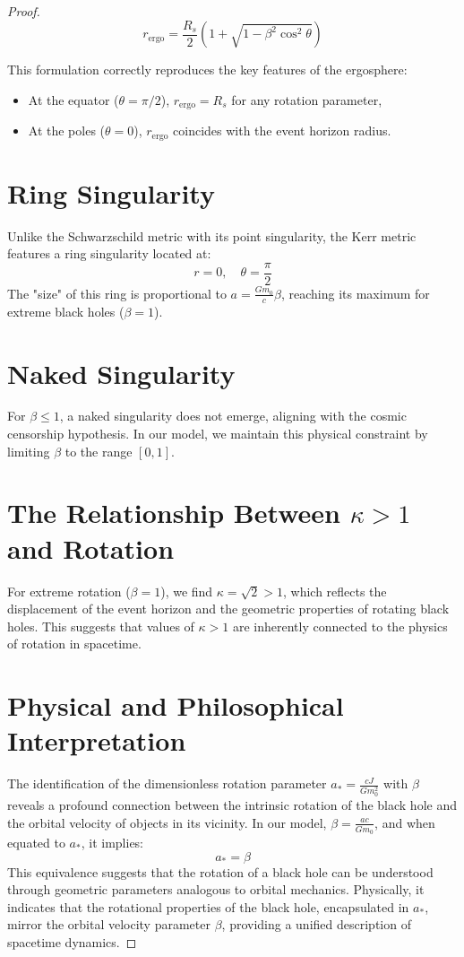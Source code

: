 \documentclass{article}
\begin{document}
\begin{theorem}
\begin{proof}
\[
r_{\text{ergo}} = \frac{R_s}{2} \left(1 + \sqrt{1 - \beta^2 \cos^2 \theta}\right)
\]

This formulation correctly reproduces the key features of the ergosphere:
\begin{itemize}
    \item At the equator (\(\theta = \pi / 2\)), \(r_{\text{ergo}} = R_s\) for any rotation parameter,
    \item At the poles (\(\theta = 0\)), \(r_{\text{ergo}}\) coincides with the event horizon radius.
\end{itemize}

\section{Ring Singularity}
Unlike the Schwarzschild metric with its point singularity, the Kerr metric features a ring singularity located at:
\[
r = 0, \quad \theta = \frac{\pi}{2}
\]
The "size" of this ring is proportional to \(a = \frac{G m_0}{c} \beta\), reaching its maximum for extreme black holes (\(\beta = 1\)).

\section{Naked Singularity}
For \(\beta \leq 1\), a naked singularity does not emerge, aligning with the cosmic censorship hypothesis. In our model, we maintain this physical constraint by limiting \(\beta\) to the range \([0, 1]\).

\section{The Relationship Between \(\kappa > 1\) and Rotation}
For extreme rotation (\(\beta = 1\)), we find \(\kappa = \sqrt{2} > 1\), which reflects the displacement of the event horizon and the geometric properties of rotating black holes. This suggests that values of \(\kappa > 1\) are inherently connected to the physics of rotation in spacetime.

\section{Physical and Philosophical Interpretation}
The identification of the dimensionless rotation parameter \(a_* = \frac{c J}{G m_0^2}\) with \(\beta\) reveals a profound connection between the intrinsic rotation of the black hole and the orbital velocity of objects in its vicinity. In our model, \(\beta = \frac{a c}{G m_0}\), and when equated to \(a_*\), it implies:
\[
a_* = \beta
\]
This equivalence suggests that the rotation of a black hole can be understood through geometric parameters analogous to orbital mechanics. Physically, it indicates that the rotational properties of the black hole, encapsulated in \(a_*\), mirror the orbital velocity parameter \(\beta\), providing a unified description of spacetime dynamics.


\end{proof}
\end{theorem}
\end{document}

